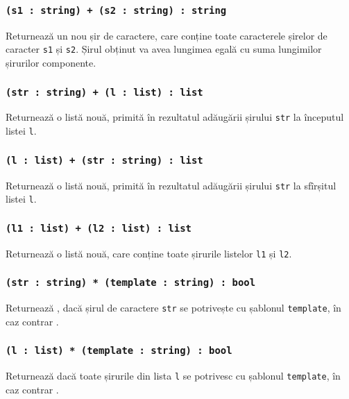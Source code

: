 \subsubsection{\texttt{(s1 : string) + (s2 : string) : string}}

Returnează un nou șir de caractere, care conține toate caracterele șirelor de caracter \texttt{s1} și \texttt{s2}. Șirul obținut va avea lungimea egală cu suma lungimilor șirurilor componente.

\subsubsection{\texttt{(str : string) + (l : list) : list}}

Returnează o listă nouă, primită în rezultatul adăugării șirului \texttt{str} la începutul listei \texttt{l}.

\subsubsection{\texttt{(l : list) + (str : string) : list}}

Returnează o listă nouă, primită în rezultatul adăugării șirului \texttt{str} la sfîrșitul listei \texttt{l}.

\subsubsection{\texttt{(l1 : list) + (l2 : list) : list}}

Returnează o listă nouă, care conține toate șirurile listelor \texttt{l1} și \texttt{l2}.

\subsubsection{\texttt{(str : string) * (template : string) : bool}}

Returnează \true{}, dacă șirul de caractere \texttt{str} se potrivește cu șablonul \texttt{template}, în caz contrar \false{}.

\subsubsection{\texttt{(l : list) * (template : string) : bool}}

Returnează \true{} dacă toate șirurile din lista \texttt{l} se potrivesc cu șablonul \texttt{template}, în caz contrar \false{}.

